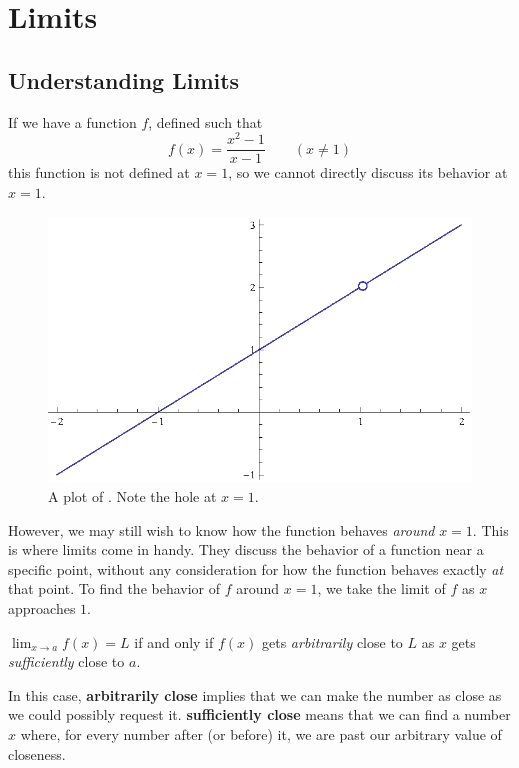 \chapter{Limits}\label{ch:limits} 
\section{Understanding Limits}
If we have a function \(f\), defined such that
\begin{equation}
  f(x)=\frac{x^2-1}{x-1} \qquad (x \neq 1)
  \label{eq:firstlimit}
\end{equation}
this function is not defined at \(x=1\), so we cannot directly discuss its behavior at \(x=1\).
\begin{figure}[h]
  \begin{center}
    \includegraphics[scale=0.7]{graphs/p1ch3x2m1xm1}
  \end{center}
  \caption{A plot of . Note the hole at \(x=1\).}
\end{figure}
However, we may still wish to know how the function behaves \emph{around} \(x=1\).
This is where limits come in handy.
They discuss the behavior of a function near a specific point, without any consideration for how the function behaves exactly \emph{at} that point.
To find the behavior of \(f\) around \(x=1\), we take the limit of \(f\) as \(x\) approaches \(1\).
\begin{defn}\label{defn:limit}
  \( \lim_{x \to a} f(x) = L \) if and only if \(f(x)\) gets \emph{arbitrarily} close to \( L \) as \(x\) gets \emph{sufficiently} close to \(a\).
\end{defn}
  In this case, \textbf{arbitrarily close} implies that we can make the number as close as we could possibly request it. \textbf{sufficiently close} means that we can find a number $x$ where, for every number after (or before) it, we are past our arbitrary value of closeness.

